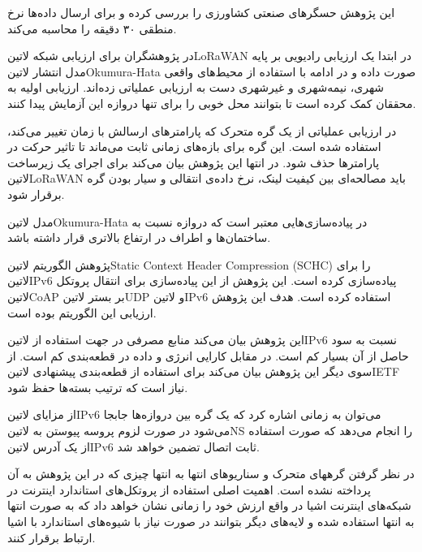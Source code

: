 این پژوهش حسگرهای صنعتی کشاورزی را بررسی کرده و برای ارسال داده‌ها نرخ منطقی ۳۰ دقیقه را محاسبه می‌کند.



در  پژوهشگران برای ارزیابی شبکه ‌لاتین{LoRaWAN} در ابتدا یک ارزیابی رادیویی بر پایه مدل انتشار ‌لاتین{Okumura-Hata} صورت داده
و در ادامه با استفاده از محیط‌های واقعی شهری، نیمه‌شهری و غیرشهری دست به ارزیابی عملیاتی زده‌اند. ارزیابی اولیه به محققان کمک کرده است تا بتوانند محل خوبی را برای
تنها دروازه این آزمایش پیدا کنند.

در ارزیابی عملیاتی از یک گره متحرک که پارامترهای ارسالش با زمان تغییر می‌کند، استفاده شده است. این گره برای بازه‌های زمانی ثابت می‌ماند تا تاثیر حرکت در پارامترها حذف شود.
در انتها این پژوهش بیان می‌کند برای اجرای یک زیرساخت ‌لاتین{LoRaWAN} باید مصالحه‌ای بین کیفیت لینک، نرخ داده‌ی انتقالی و سیار بودن گره برقرار شود.

مدل ‌لاتین{Okumura-Hata} در پیاده‌سازی‌هایی معتبر است که دروازه نسبت به ساختمان‌ها و اطراف در ارتفاع بالاتری قرار داشته باشد.



پژوهش 
الگوریتم ‌لاتین{Static Context Header Compression (SCHC)} را برای ‌لاتین{IPv6} پیاده‌سازی کرده است.
این پژوهش از این پیاده‌سازی برای انتقال پروتکل ‌لاتین{CoAP} بر بستر ‌لاتین{UDP} و ‌لاتین{IPv6} استفاده کرده است.
هدف این پژوهش ارزیابی این الگوریتم بوده است.

این پژوهش بیان می‌کند منابع مصرفی در جهت استفاده از ‌لاتین{IPv6} نسبت به سود حاصل از آن بسیار کم است. در مقابل کارایی انرژی و داده در قطعه‌بندی کم است.
از سوی دیگر این پژوهش بیان می‌کند برای استفاده از قطعه‌بندی پیشنهادی ‌لاتین{IETF} نیاز است که ترتیب بسته‌ها حفظ شود.

از مزایای ‌لاتین{IPv6} می‌توان به زمانی اشاره کرد که یک گره بین دروازه‌ها جابجا می‌شود در صورت لزوم پروسه پیوستن به ‌لاتین{NS} را انجام می‌دهد که صورت استفاده از یک آدرس ‌لاتین{IPv6} ثابت اتصال تضمین خواهد شد.

در نظر گرفتن گرههای متحرک و سناریوهای انتها به انتها چیزی که در این پژوهش به آن پرداخته نشده است. اهمیت اصلی استفاده از پروتکل‌های استاندارد اینترنت در شبکه‌های اینترنت اشیا
در واقع ارزش خود را زمانی نشان خواهد داد که به صورت انتها به انتها استفاده شده و لایه‌های دیگر بتوانند در صورت نیاز با شیوه‌های استاندارد با اشیا ارتباط برقرار کنند.


